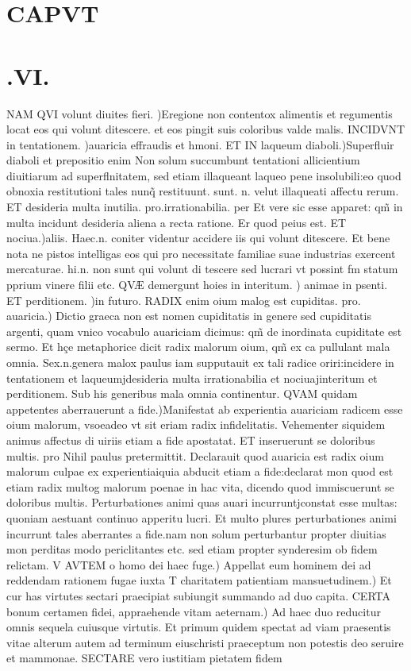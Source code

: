 \documentclass{article}
\begin{document}
\begin{pages}
\section*{CAPVT }
\section*{.VI. }\pstart NAM QVI volunt diuites fieri. )Eregione non contentox alimentis et regumentis locat eos qui volunt ditescere. et eos pingit suis coloribus valde malis. INCIDVNT in tentationem. )auaricia effraudis  et hmoni. ET IN laqueum diaboli.)Superfluir diaboli et prepositio enim Non solum succumbunt tentationi allicientium diuitiarum ad superflnitatem, sed etiam illaqueant laqueo pene insolubili:eo quod obnoxia restitutioni tales nunq̃ restituunt. sunt. n. velut illaqueati affectu rerum. ET desideria multa inutilia. pro.irrationabilia. per Et vere sic esse apparet: qm̃ in multa incidunt desideria aliena a recta ratione. Er quod peius est. ET nociua.)aliis. Haec.n. coniter videntur accidere iis qui volunt ditescere. Et bene nota ne pistos intelligas eos qui pro necessitate familiae suae industrias exercent mercaturae. hi.n. non sunt qui volunt di tescere sed lucrari vt possint fm statum pprium vinere filii etc. QVÆ demergunt hoies in interitum. ) animae in psenti. ET perditionem. )in futuro. RADIX enim oium malog est cupiditas. pro. auaricia.) Dictio graeca non est nomen cupiditatis in genere sed cupiditatis argenti, quam vnico vocabulo auariciam dicimus: qm̃ de inordinata cupiditate est sermo. Et hçe metaphorice dicit radix malorum oium, qm̃ ex ca pullulant mala omnia. Sex.n.genera malox paulus iam supputauit ex tali radice oriri:incidere in tentationem et laqueumjdesideria multa irrationabilia et nociuajinteritum et perditionem. Sub his generibus mala omnia continentur. QVAM quidam appetentes aberrauerunt a fide.)Manifestat ab experientia auariciam radicem esse oium malorum, vsoeadeo vt sit eriam radix infidelitatis. Vehementer siquidem animus affectus di uiriis etiam a fide apostatat. ET inseruerunt se doloribus multis. pro Nihil paulus pretermittit. Declarauit quod auaricia est radix oium malorum culpae ex experientiaiquia abducit etiam a fide:declarat mon quod est etiam radix multog malorum poenae in hac vita, dicendo quod immiscuerunt se doloribus multis. Perturbationes animi quas auari incurruntjconstat esse multas: quoniam aestuant continuo apperitu lucri. Et multo plures perturbationes animi incurrunt tales aberrantes a fide.nam non solum perturbantur propter diuitias mon perditas modo periclitantes etc. sed etiam propter synderesim ob fidem relictam.  \pend
\marginpar{[ p.146 ]}\pstart V AVTEM o homo dei haec fuge.) Appellat eum hominem dei ad reddendam rationem fugae iuxta T charitatem patientiam mansuetudinem.) Et cur has virtutes sectari praecipiat subiungit summando ad duo capita. CERTA bonum certamen fidei, appraehende vitam aeternam.) Ad haec duo reducitur omnis sequela cuiusque virtutis. Et primum quidem spectat ad viam praesentis vitae alterum autem ad terminum eiuschristi praeceptum non potestis deo seruire et mammonae. SECTARE vero iustitiam pietatem fidem  \pend

\end{pages}
\end{document}
